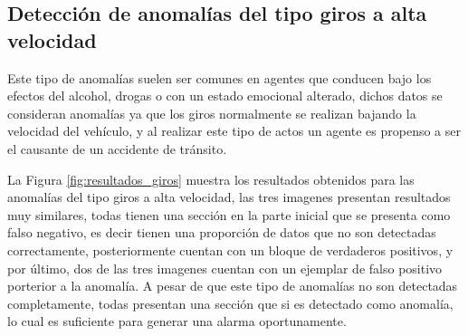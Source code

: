 \subsection{Detecci\'{o}n de anomal\'{i}as del tipo giros a alta velocidad}

Este tipo de anomal\'{i}as suelen ser comunes en agentes que conducen bajo los efectos del alcohol, drogas o con un estado emocional alterado, dichos datos se consideran anomal\'{i}as ya que los giros normalmente se realizan bajando la velocidad del veh\'{i}culo, y al realizar este tipo de actos un agente es propenso a ser el causante de un accidente de tr\'{a}nsito.

\vspace{5mm} %

La Figura \ref{fig:resultados_giros} muestra los resultados obtenidos para las anomal\'{i}as del tipo giros a alta velocidad, las tres imagenes presentan resultados muy similares, todas tienen una secci\'{o}n en la parte inicial que se presenta como falso negativo, es decir tienen una proporci\'{o}n de datos que no son detectadas correctamente, posteriormente cuentan con un bloque de verdaderos positivos, y por \'{u}ltimo, dos de las tres imagenes cuentan con un ejemplar de falso positivo porterior a la anomal\'{i}a. A pesar de que este tipo de anomal\'{i}as no son detectadas completamente, todas presentan una secci\'{o}n que si es detectado como anomal\'{i}a, lo cual es suficiente para generar una alarma oportunamente.

